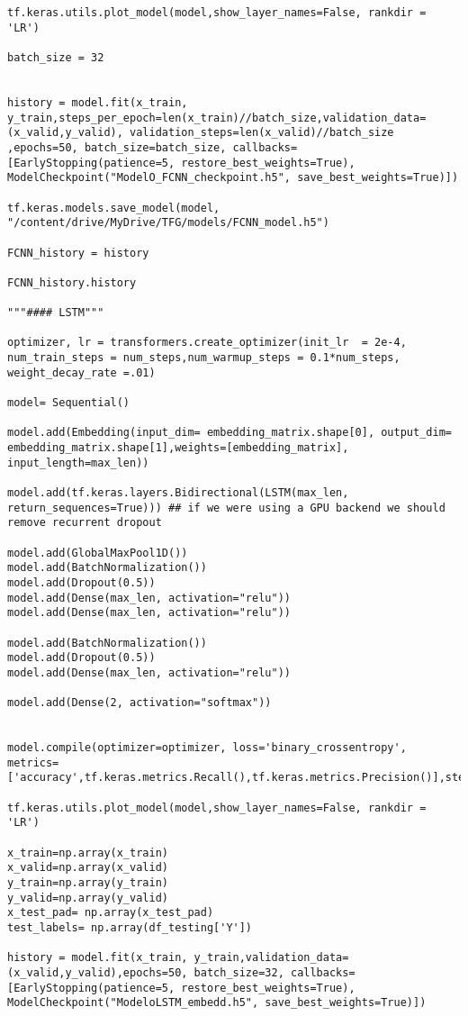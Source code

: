 \documentclass[10pt,riqno,a4paper,twoside]{article}\usepackage[]{graphicx}\usepackage[]{color}
\begin{document}
\begin{lstlisting}
tf.keras.utils.plot_model(model,show_layer_names=False, rankdir = 'LR')

batch_size = 32


history = model.fit(x_train, y_train,steps_per_epoch=len(x_train)//batch_size,validation_data=(x_valid,y_valid), validation_steps=len(x_valid)//batch_size
,epochs=50, batch_size=batch_size, callbacks=[EarlyStopping(patience=5, restore_best_weights=True), ModelCheckpoint("ModelO_FCNN_checkpoint.h5", save_best_weights=True)])

tf.keras.models.save_model(model, "/content/drive/MyDrive/TFG/models/FCNN_model.h5")

FCNN_history = history

FCNN_history.history

"""#### LSTM"""

optimizer, lr = transformers.create_optimizer(init_lr  = 2e-4, num_train_steps = num_steps,num_warmup_steps = 0.1*num_steps, weight_decay_rate =.01)

model= Sequential()
    
model.add(Embedding(input_dim= embedding_matrix.shape[0], output_dim= embedding_matrix.shape[1],weights=[embedding_matrix], input_length=max_len))

model.add(tf.keras.layers.Bidirectional(LSTM(max_len, return_sequences=True))) ## if we were using a GPU backend we should remove recurrent dropout
    
model.add(GlobalMaxPool1D())
model.add(BatchNormalization())
model.add(Dropout(0.5))
model.add(Dense(max_len, activation="relu"))
model.add(Dense(max_len, activation="relu"))
    
model.add(BatchNormalization())
model.add(Dropout(0.5))
model.add(Dense(max_len, activation="relu"))
    
model.add(Dense(2, activation="softmax"))
    

model.compile(optimizer=optimizer, loss='binary_crossentropy', metrics=['accuracy',tf.keras.metrics.Recall(),tf.keras.metrics.Precision()],steps_per_execution=32)

tf.keras.utils.plot_model(model,show_layer_names=False, rankdir = 'LR')

x_train=np.array(x_train)
x_valid=np.array(x_valid)
y_train=np.array(y_train)
y_valid=np.array(y_valid)
x_test_pad= np.array(x_test_pad)
test_labels= np.array(df_testing['Y'])

history = model.fit(x_train, y_train,validation_data=(x_valid,y_valid),epochs=50, batch_size=32, callbacks=[EarlyStopping(patience=5, restore_best_weights=True), ModelCheckpoint("ModeloLSTM_embedd.h5", save_best_weights=True)])


\end{lstlisting}
\end{document}
